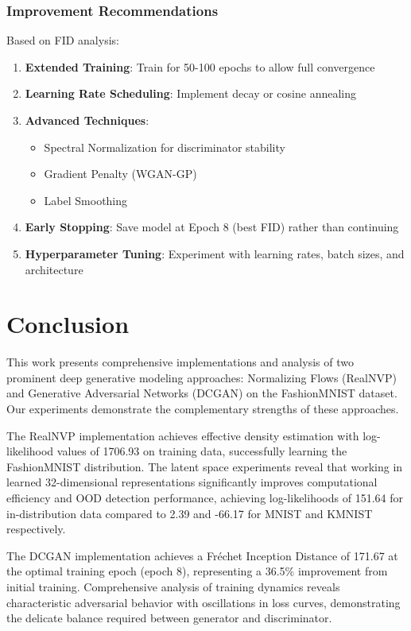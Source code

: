 \documentclass[conference,12pt]{IEEEtran}
\begin{document}
\subsubsection{Improvement Recommendations}

Based on FID analysis:

\begin{enumerate}
    \item \textbf{Extended Training}: Train for 50-100 epochs to allow full convergence
    \item \textbf{Learning Rate Scheduling}: Implement decay or cosine annealing
    \item \textbf{Advanced Techniques}:
    \begin{itemize}
        \item Spectral Normalization for discriminator stability
        \item Gradient Penalty (WGAN-GP)
        \item Label Smoothing
    \end{itemize}
    \item \textbf{Early Stopping}: Save model at Epoch 8 (best FID) rather than continuing
    \item \textbf{Hyperparameter Tuning}: Experiment with learning rates, batch sizes, and architecture
\end{enumerate}

\section{Conclusion}

This work presents comprehensive implementations and analysis of two prominent deep generative modeling approaches: Normalizing Flows (RealNVP) and Generative Adversarial Networks (DCGAN) on the FashionMNIST dataset. Our experiments demonstrate the complementary strengths of these approaches.

The RealNVP implementation achieves effective density estimation with log-likelihood values of 1706.93 on training data, successfully learning the FashionMNIST distribution. The latent space experiments reveal that working in learned 32-dimensional representations significantly improves computational efficiency and OOD detection performance, achieving log-likelihoods of 151.64 for in-distribution data compared to 2.39 and -66.17 for MNIST and KMNIST respectively.

The DCGAN implementation achieves a Fréchet Inception Distance of 171.67 at the optimal training epoch (epoch 8), representing a 36.5\% improvement from initial training. Comprehensive analysis of training dynamics reveals characteristic adversarial behavior with oscillations in loss curves, demonstrating the delicate balance required between generator and discriminator.
\end{document}
